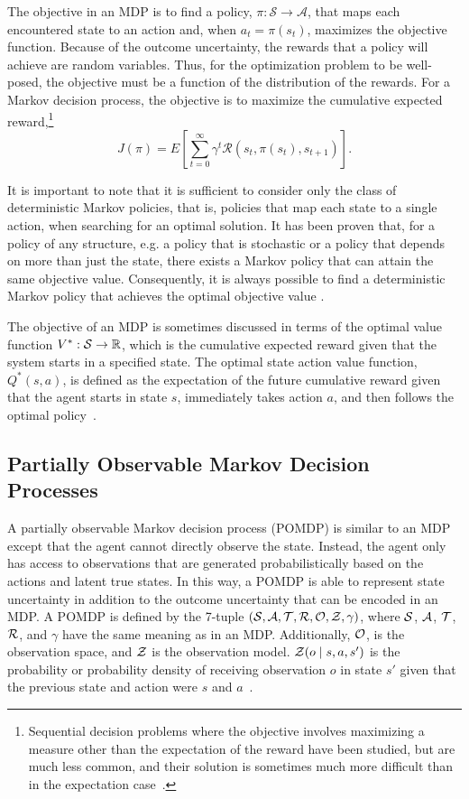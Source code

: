 The objective in an MDP is to find a policy, $\pi: \mathcal{S} \to \mathcal{A}$, that maps each encountered state to an action and, when $a_t = \pi(s_t)$, maximizes the objective function.
Because of the outcome uncertainty, the rewards that a policy will achieve are random variables.
Thus, for the optimization problem to be well-posed, the objective must be a function of the distribution of the rewards.
For a Markov decision process, the objective is to maximize the cumulative expected reward,\footnote{Sequential decision problems where the objective involves maximizing a measure other than the expectation of the reward have been studied, but are much less common, and their solution is sometimes much more difficult than in the expectation case~\cite{chow2015risk}.}
\begin{equation} \label{eq:cumulative}
    J(\pi) = E\left[\sum_{t=0}^\infty \gamma^t \mathcal{R}(s_t, \pi(s_t), s_{t+1})\right] \text{.}
\end{equation}

It is important to note that it is sufficient to consider only the class of deterministic Markov policies, that is, policies that map each state to a single action, when searching for an optimal solution.
It has been proven that, for a policy of any structure, e.g. a policy that is stochastic or a policy that depends on more than just the state, there exists a Markov policy that can attain the same objective value.
Consequently, it is always possible to find a deterministic Markov policy that achieves the optimal objective value \cite{EA:99}.

The objective of an MDP is sometimes discussed in terms of the optimal value function $V^*: \mathcal{S} \to \mathbb{R}$, which is the cumulative expected reward given that the system starts in a specified state.
The optimal state action value function, $Q^*(s,a)$, is defined as the expectation of the future cumulative reward given that the agent starts in state $s$, immediately takes action $a$, and then follows the optimal policy~\cite{DB:05,kochenderfer2015decision,EA:99}.

\subsection{Partially Observable Markov Decision Processes} \label{sec:pomdps}

A partially observable Markov decision process (POMDP) is similar to an MDP except that the agent cannot directly observe the state.
Instead, the agent only has access to observations that are generated probabilistically based on the actions and latent true states.
In this way, a POMDP is able to represent state uncertainty in addition to the outcome uncertainty that can be encoded in an MDP.
A POMDP is defined by the 7-tuple $(\mathcal{S}, \mathcal{A}, \mathcal{T}, \mathcal{R}, \mathcal{O}, \mathcal{Z}, \gamma)$, where $\mathcal{S}$, $\mathcal{A}$, $\mathcal{T}$, $\mathcal{R}$, and $\gamma$ have the same meaning as in an MDP.
Additionally, $\mathcal{O}$, is the observation space, and $\mathcal{Z}$ is the observation model.
$\mathcal{Z}(o \mid s, a, s')$ is the probability or probability density of receiving observation $o$ in state $s'$ given that the previous state and action were $s$ and $a$~\cite{DB:05,kochenderfer2015decision,kaelbling1998planning}.

